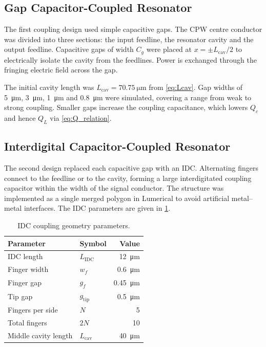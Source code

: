 \documentclass[12pt,a4paper]{article}
\begin{document}
\subsection{Gap Capacitor-Coupled Resonator}

The first coupling design used simple capacitive gaps. The CPW centre
conductor was divided into three sections: the input feedline, the
resonator cavity and the output feedline. Capacitive gaps of width $C_g$
were placed at $x = \pm L_{\mathrm{cav}}/2$ to electrically isolate the
cavity from the feedlines. Power is exchanged through the fringing
electric field across the gap.

The initial cavity length was $L_{\mathrm{cav}} = \SI{70.75}{\micro\metre}$
from \cref{eq:Lcav}. Gap widths of \SI{5}{\micro\metre},
\SI{3}{\micro\metre}, \SI{1}{\micro\metre} and \SI{0.8}{\micro\metre}
were simulated, covering a range from weak to strong coupling. Smaller
gaps increase the coupling capacitance, which lowers $Q_c$ and hence
$Q_L$ via \cref{eq:Q_relation}.

\subsection{Interdigital Capacitor-Coupled Resonator}

The second design replaced each capacitive gap with an IDC. Alternating
fingers connect to the feedline or to the cavity, forming a large
interdigitated coupling capacitor within the width of the signal
conductor. The structure was implemented as a single merged polygon in
Lumerical to avoid artificial metal--metal interfaces. The IDC parameters
are given in \cref{tab:idc_params}.

\begin{table}[htbp]
    \centering
    \caption{IDC coupling geometry parameters.}
    \label{tab:idc_params}
    \begin{tabular}{llr}
        \toprule
        Parameter & Symbol & Value \\
        \midrule
        IDC length          & $L_{\mathrm{IDC}}$    & \SI{12}{\micro\metre}    \\
        Finger width        & $w_f$                 & \SI{0.6}{\micro\metre}   \\
        Finger gap          & $g_f$                 & \SI{0.45}{\micro\metre}  \\
        Tip gap             & $g_{\mathrm{tip}}$    & \SI{0.5}{\micro\metre}   \\
        Fingers per side    & $N$                   & 5                        \\
        Total fingers       & $2N$                  & 10                       \\
        Middle cavity length& $L_{\mathrm{cav}}$    & \SI{40}{\micro\metre}    \\
        \bottomrule
    \end{tabular}
\end{table}
\end{document}
